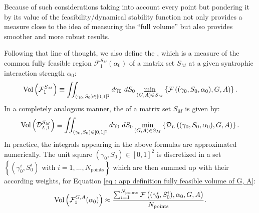 \documentclass[12pt]{report}
\begin{document}
Because of such considerations taking into account every point but pondering it by its value of the feasibility/dynamical stability function not only provides a measure close to the idea of measuring the ``full volume'' but also provides smoother and more robust results.

Following that line of thought, we also define the , which is a measure of the common fully feasible region $\mathcal{F}_1^{S_M}(\alpha_0)$ of a matrix set $S_M$ at a given syntrophic interaction strength $\alpha_0$:
\begin{equation}
\text{Vol}\left(\mathcal{F}_1^{S_M}\right) \equiv \iint_{(\gamma_0, S_0) \in [0,1]^2} d\gamma_0 \ dS_0 \min_{(G,A)\in S_M} \left\{\mathcal{F}\left((\gamma_0, S_0, \alpha_0), G, A\right)\right\}.
\end{equation}
In a completely analogous manner, the  of a matrix set $S_M$ is given by:
\begin{equation}
\text{Vol}\left(\mathcal{D}_{L,1}^{S_M}\right) \equiv \iint_{(\gamma_0, S_0) \in [0,1]^2} d\gamma_0 \ dS_0 \min_{(G,A)\in S_M} \left\{\mathcal{D}_{L}\left((\gamma_0, S_0, \alpha_0), G, A\right)\right\}.
\end{equation}
In practice, the integrals appearing in the above formulas are approximated numerically. The unit square $(\gamma_0, S_0) \in [0,1]^2$ is discretized in a set $\left\{(\gamma_0^i, S_0^{i})\text{ with } i=1, \dots, N_\text{points}\right\}$ which are then summed up with their according weights, \eg for Equation \eqref{eq : app definition fully feasible volume of G, A}:
\begin{equation}
\text{Vol}\left(\mathcal{F}_1^{G,A}(\alpha_0)\right) \approx \frac{\sum_{i=1}^{N_\text{points}}\mathcal{F}\left((\gamma_0^{i}, S_0^{i}), \alpha_0, G, A\right)}{N_\text{points}}.
\end{equation}
\end{document}
